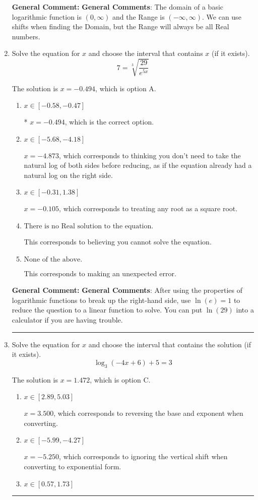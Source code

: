 \documentclass{extbook}[14pt]
\newcommand{\litem}[1]{\item #1

\rule{\textwidth}{0.4pt}}
\begin{document}
\begin{enumerate}
{\textbf{General Comment:} \textbf{General Comments}: The domain of a basic logarithmic function is $(0, \infty)$ and the Range is $(-\infty, \infty)$. We can use shifts when finding the Domain, but the Range will always be all Real numbers.
}
\litem{
 Solve the equation for $x$ and choose the interval that contains $x$ (if it exists).
\[  7 = \sqrt[3]{\frac{29}{e^{5x}}} \]

The solution is \( x = -0.494 \), which is option A.\begin{enumerate}[label=\Alph*.]
\item \( x \in [-0.58, -0.47] \)

* $x = -0.494$, which is the correct option.
\item \( x \in [-5.68, -4.18] \)

$x = -4.873$, which corresponds to thinking you don't need to take the natural log of both sides before reducing, as if the equation already had a natural log on the right side.
\item \( x \in [-0.31, 1.38] \)

$x = -0.105$, which corresponds to treating any root as a square root.
\item \( \text{There is no Real solution to the equation.} \)

This corresponds to believing you cannot solve the equation.
\item \( \text{None of the above.} \)

This corresponds to making an unexpected error.
\end{enumerate}

\textbf{General Comment:} \textbf{General Comments}: After using the properties of logarithmic functions to break up the right-hand side, use $\ln(e) = 1$ to reduce the question to a linear function to solve. You can put $\ln(29)$ into a calculator if you are having trouble.
}
\litem{
Solve the equation for $x$ and choose the interval that contains the solution (if it exists).
\[ \log_{3}{(-4x+6)}+5 = 3 \]

The solution is \( x = 1.472 \), which is option C.\begin{enumerate}[label=\Alph*.]
\item \( x \in [2.89, 5.03] \)

$x = 3.500$, which corresponds to reversing the base and exponent when converting.
\item \( x \in [-5.99, -4.27] \)

$x = -5.250$, which corresponds to ignoring the vertical shift when converting to exponential form.
\item \( x \in [0.57, 1.73] \)


\end{enumerate}}
\end{enumerate}
\end{document}
